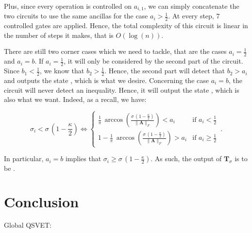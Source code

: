 \documentclass[11pt, a4paper]{article}
\begin{document}
            Plus, since every operation is controlled on \(a_{i,1}\), we can simply concatenate the two circuits to use the same ancillas for the case \(a_i>\frac12\). At every step, \(7\) controlled gates are applied. Hence, the total complexity of this circuit is linear in the number of steps it makes, that is \(O(\log(n))\).
            
            There are still two corner cases which we need to tackle, that are the cases \(a_i=\frac12\) and \(a_i=b\). If \(a_i=\frac12\), it will only be considered by the second part of the circuit. Since \(b_1<\frac12\), we know that \(b_2>\frac12\). Hence, the second part will detect that \(b_2>a_i\) and outputs the state , which is what we desire. Concerning the case \(a_i=b\), the circuit will never detect an inequality. Hence, it will output the state , which is also what we want. Indeed, as a recall, we have:
            
            \[\sigma_i < \sigma\,\left(1 - \frac\kappa2\right)\iff\begin{cases}\frac1\pi\,\arccos\left(\frac{\sigma\,\left(1 - \frac\kappa2\right)}{\|\mathbf{A}\|_F}\right) < a_i&\text{if }a_i<\frac12\\1-\frac1\pi\,\arccos\left(\frac{\sigma\,\left(1 - \frac\kappa2\right)}{\|\mathbf{A}\|_F}\right) > a_i&\text{if }a_i\geqslant\frac12\end{cases}\,.\]
            
            In particular, \(a_i=b\) implies that \(\sigma_i \geqslant \sigma\,\left(1 - \frac\kappa2\right)\). As such, the output of \(\mathbf{T}_\sigma\) is to be .
            

    \section{Conclusion}            
        Global QSVET:
        
\end{document}
